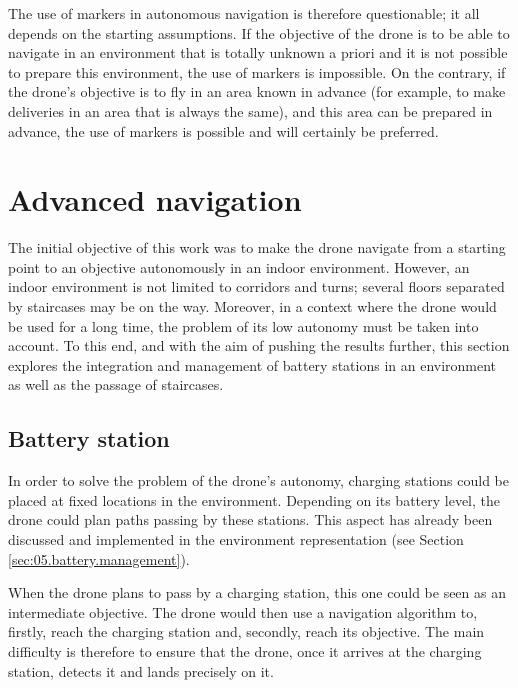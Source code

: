 \begin{note}
    The use of markers in autonomous navigation is therefore questionable; it all depends on the starting assumptions. If the objective of the drone is to be able to navigate in an environment that is totally unknown a priori and it is not possible to prepare this environment, the use of markers is impossible. On the contrary, if the drone's objective is to fly in an area known in advance (for example, to make deliveries in an area that is always the same), and this area can be prepared in advance, the use of markers is possible and will certainly be preferred.
\end{note}

\section{Advanced navigation}

The initial objective of this work was to make the drone navigate from a starting point to an objective autonomously in an indoor environment. However, an indoor environment is not limited to corridors and turns; several floors separated by staircases may be on the way. Moreover, in a context where the drone would be used for a long time, the problem of its low autonomy must be taken into account. To this end, and with the aim of pushing the results further, this section explores the integration and management of battery stations in an environment as well as the passage of staircases.

\subsection{Battery station}

In order to solve the problem of the drone's autonomy, charging stations could be placed at fixed locations in the environment. Depending on its battery level, the drone could plan paths passing by these stations. This aspect has already been discussed and implemented in the environment representation (see Section \ref{sec:05.battery.management}).

When the drone plans to pass by a charging station, this one could be seen as an intermediate objective. The drone would then use a navigation algorithm to, firstly, reach the charging station and, secondly, reach its objective. The main difficulty is therefore to ensure that the drone, once it arrives at the charging station, detects it and lands precisely on it.

